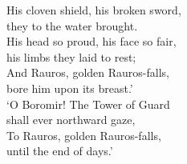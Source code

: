 His cloven shield, his broken sword, \\
they to the water brought. \tab{}\\
His head so proud, his face so fair, \\
his limbs they laid to rest; \tab{}\\
And Rauros, golden Rauros-falls, \\
bore him upon its breast.’ \tab{}\\
\hops
{} ‘O Boromir! The Tower of Guard \\
 shall ever northward gaze, \\
 To Rauros, golden Rauros-falls, \\
 until the end of days.’ \tab{} 
